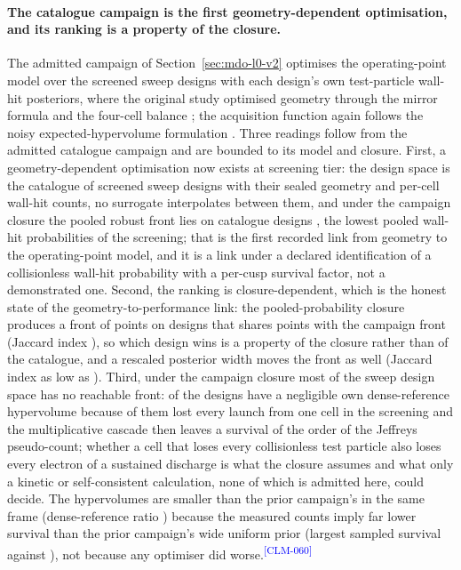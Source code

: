 \documentclass[11pt]{article}
\newcommand{\EvidenceClaim}[2]{#2\textsuperscript{\textcolor{blue}{[#1]}}}
\begin{document}
\paragraph{The catalogue campaign is the first geometry-dependent optimisation,
and its ranking is a property of the closure.}
The admitted campaign of Section~\ref{sec:mdo-l0-v2} optimises the
operating-point model over the screened sweep designs with each design's own
test-particle wall-hit posteriors, where the original study optimised geometry
through the mirror formula and the four-cell balance \cite{Muffatti2017}; the
acquisition function again follows the noisy expected-hypervolume formulation
\cite{Daulton2021}.
\EvidenceClaim{CLM-060}{Three readings follow from the admitted catalogue
campaign and are bounded to its model and closure. First, a geometry-dependent
optimisation now exists at screening tier: the design space is the catalogue of
\MdbCatalogueSize{} screened sweep designs with their sealed geometry and
per-cell wall-hit counts, no surrogate interpolates between them, and under the
campaign closure the pooled robust front lies on catalogue designs
\MdbRobustFrontDesigns, the \MdbRobustFrontDesignCount{} lowest pooled wall-hit
probabilities of the screening; that is the first recorded link from geometry to
the operating-point model, and it is a link under a declared identification of a
collisionless wall-hit probability with a per-cusp survival factor, not a
demonstrated one. Second, the ranking is closure-dependent, which is the honest
state of the geometry-to-performance link: the pooled-probability closure
produces a front of \MdbClTwoFront{} points on \MdbClTwoFrontDesignCount{}
designs that shares \MdbClTwoShared{} points with the campaign front (Jaccard
index \MdbClTwoJaccard), so which design wins is a property of the closure rather
than of the catalogue, and a rescaled posterior width moves the front as well
(Jaccard index as low as \MdbWidthJaccardMin). Third, under the campaign closure
most of the sweep design space has no reachable front:
\MdbDenseNegligibleDesigns{} of the \MdbCatalogueSize{} designs have a negligible
own dense-reference hypervolume because \MdbDenseNegligibleSaturated{} of them
lost every launch from one cell in the screening and the multiplicative cascade
then leaves a survival of the order of the Jeffreys pseudo-count; whether a cell
that loses every collisionless test particle also loses every electron of a
sustained discharge is what the closure assumes and what only a kinetic or
self-consistent calculation, none of which is admitted here, could decide. The
hypervolumes are smaller than the prior campaign's in the same frame
(dense-reference ratio \MdbPriorToThisDenseHvRatio) because the measured counts
imply far lower survival than the prior campaign's wide uniform prior (largest
sampled survival \MdbCampaignSurvivalMax{} against \MdbPriorSurvivalMax), not
because any optimiser did worse.}
\end{document}
